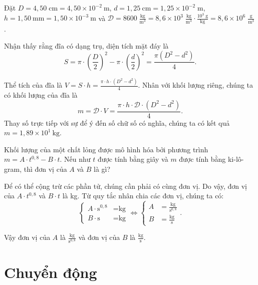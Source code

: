 \documentclass[a4paper, titlepage, openany]{book}
\newcounter{exercise}
\newcounter{solution}
\numberwithin{equation}{chapter}
\begin{document}
\solution

Đặt $D=4{,}50\;\text{cm}=4{,}50\times 10^{-2}\ \text{m}$, $d=1{,}25\ \text{cm}=1{,}25\times 10^{-2}\;\text{m}$, $h=1{,}50\ \text{mm}=1{,}50\times 10^{-3}\ \text{m}$ và $\mathcal{D}=8600\;\frac{\text{kg}}{\text{m}^3}=8{,}6\times 10^3\;\frac{\text{kg}}{\text{m}^3}\cdot \frac{10^3\;\text{g}}{\text{kg}}=8{,}6\times 10^6\;\frac{\text{g}}{\text{m}^3}$.

Nhận thấy rằng đĩa có dạng trụ, diện tích mặt đáy là $$S=\pi\cdot \left(\frac{D}{2}\right)^2-\pi\cdot \left(\frac{d}{2}\right)^2=\frac{\pi \left(D^2-d^2\right)}{4}.$$

Thể tích của đĩa là $V=S\cdot h=\frac{\pi \cdot h\cdot \left(D^2-d^2\right)}{4}.$ Nhân với khối lượng riêng, chúng ta có khối lượng của đĩa là $$m=\mathcal{D}\cdot V=\frac{\pi \cdot h\cdot \mathcal{D}\cdot \left(D^2-d^2\right)}{4}.$$ Thay số trực tiếp với sự để ý đến số chữ số có nghĩa, chúng ta có kết quả $m=\boxed{1{,}89\times 10^1\ \text{kg}}$.

\exercise Khối lượng của một chất lỏng được mô hình hóa bởi phương trình $m=A\cdot t^{0{,}8}-B\cdot t$. Nếu như $t$ được tính bằng giây và $m$ được tính bằng ki-lô-gram, thì đơn vị của $A$ và $B$ là gì?

\solution

Để có thể cộng trừ các phần tử, chúng cần phải có cùng đơn vị. Do vậy, đơn vị của $A\cdot t^{0{,}8}$ và $B\cdot t$ là kg. Từ quy tắc nhân chia các đơn vị, chúng ta có:
\begin{equation*}
   \begin{cases}
      A\cdot \text{s}^{0{,}8} &=\text{kg} \\
      B\cdot\text{s} &=\text{kg}
   \end{cases}
   \iff
   \begin{cases}
      A &=\frac{\text{kg}}{\text{s}^{0{,}8}} \\
      B&=\frac{\text{kg}}{\text{s}}
   \end{cases}.
\end{equation*}

Vậy đơn vị của $A$ là $\boxed{\frac{\text{kg}}{\text{s}^{0{,}8}}}$ và đơn vị của $B$ là $\boxed{\frac{\text{kg}}{\text{s}}}$.

\chapter{Chuyển động}
\end{document}
